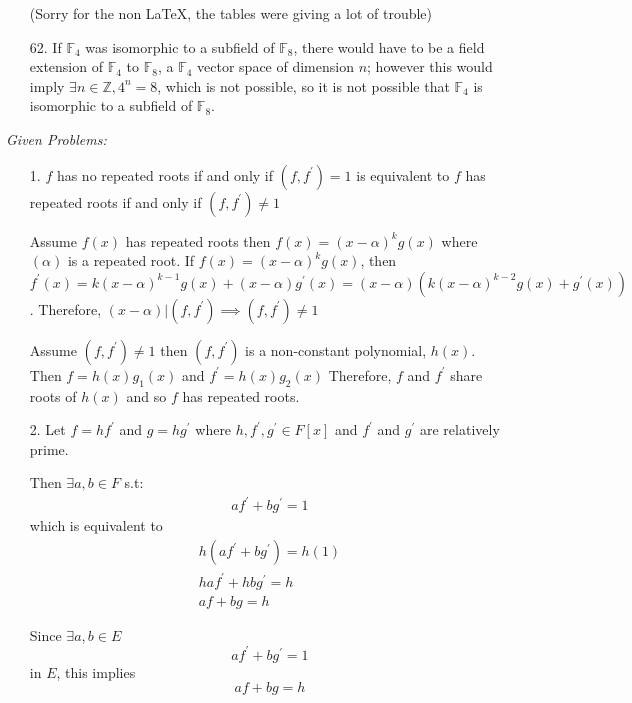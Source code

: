 \documentclass{article}
\begin{document}
\begin{enumerate}
    (Sorry for the non LaTeX, the tables were giving a lot of trouble)

    \item[62.] If \(\mathbb{F}_4\) was isomorphic to a subfield of \(\mathbb{F}_8\), there would have to be a field extension of \(\mathbb{F}_4\) to \(\mathbb{F}_8\), a \(\mathbb{F}_4\) vector space of dimension \(n\); however this would imply \(\exists n \in \mathbb{Z}, 4^n = 8\), which is not possible, so it is not possible that \(\mathbb{F}_4\) is isomorphic to a subfield of \(\mathbb{F}_8\).
\end{enumerate}

\emph{Given Problems:}
\begin{enumerate}
    \item[1.] \(f\) has no repeated roots if and only if \((f,f^\prime) = 1\) is equivalent to \(f\) has repeated roots if and only if \((f,f^\prime) \neq 1\)
    
    Assume \(f(x)\) has repeated roots then \(f(x) = (x-\alpha)^k g(x)\) where \((\alpha)\) is a repeated root. If \(f(x) = (x-\alpha)^k g(x)\), then \(f^\prime(x) = k(x-\alpha)^{k-1}g(x) + (x-\alpha)g^\prime (x) = (x-\alpha)(k (x-\alpha)^{k-2} g(x) + g^\prime (x))\). Therefore, \((x-\alpha) | (f, f^\prime) \implies (f, f^\prime) \neq 1\)
    
    Assume \((f,f^\prime) \neq 1\) then \((f,f^\prime)\) is a non-constant polynomial, \(h(x)\). Then \(f = h(x)g_1(x)\) and \(f^\prime = h(x)g_2(x)\) Therefore, \(f\) and \(f^\prime\) share roots of \(h(x)\) and so \(f\) has repeated roots. 

    \item[2.] 
    Let \(f = h f^\prime\) and \(g = h g^\prime \) where \(h, f^\prime, g^\prime \in F[x]\) and \(f^\prime\) and \(g^\prime\) are relatively prime.   

    Then \(\exists a,b \in F\) s.t:
    \begin{eqnarray*}
        af^\prime  + bg^\prime = 1 
    \end{eqnarray*}
    which is equivalent to
    \begin{eqnarray*}
        h(af^\prime  + bg^\prime) = h(1) \\
        h af^\prime  + h bg^\prime = h \\
        af + bg = h 
    \end{eqnarray*}

    Since \(\exists a,b \in E\)
    \[
        af^\prime  + bg^\prime = 1
    \]
    in \(E\), this implies
    \[
        af + bg = h
    \]


\end{enumerate}
\end{document}
